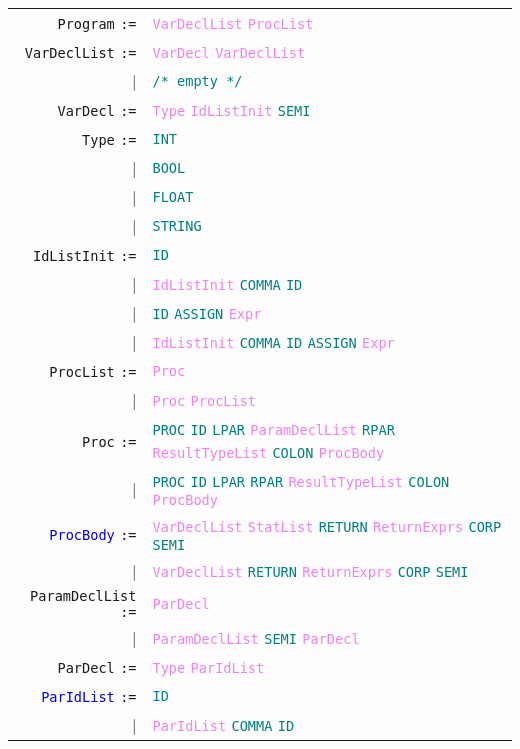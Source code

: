 \documentclass[a4paper,12pt]{article}
\newcommand\nonterm[1]{\texttt{\textcolor{violet}{#1}}}
\newcommand\term[1]{\texttt{\textcolor{teal}{#1}}}
\newcommand\production[1]{\texttt{#1} \texttt{:=}}
\newcommand\emptyprod{\texttt{\textcolor{teal}{/* empty */}}}
\begin{document}
	\begin{tabular}{rl}
    \production{Program}     & \nonterm{VarDeclList} \nonterm{ProcList} \\
	\production{VarDeclList} & \nonterm{VarDecl} \nonterm{VarDeclList} \\
	                                     | & \emptyprod \\
	\production{VarDecl}      & \nonterm{Type} \nonterm{IdListInit} \term{SEMI} \\
	\production{Type}           & \term{INT} \\ 
					   | &\term{BOOL} \\ 
					   | &\term{FLOAT} \\
					   | &\term{STRING} \\
	\production{IdListInit}     &\term{ID} \\
					   |&\nonterm{IdListInit} \term{COMMA} \term{ID} \\
					   |&\term{ID} \term{ASSIGN} \nonterm{Expr} \\
					   |&\nonterm{IdListInit} \term{COMMA} \term{ID} \term{ASSIGN} \nonterm{Expr} \\
	\production{ProcList}    &\nonterm{Proc} \\
					  |&\nonterm{Proc} \nonterm{ProcList} \\
	\production{Proc}         & \term{PROC} \term{ID} \term{LPAR} \nonterm{ParamDeclList} \term{RPAR} \nonterm{ResultTypeList} \term{COLON} %
						\nonterm{ProcBody}\\
					  |& \term{PROC} \term{ID} \term{LPAR} \term{RPAR} \nonterm{ResultTypeList} \term{COLON} \nonterm{ProcBody}\\
	\production{\textcolor{blue}{ProcBody}} & \nonterm{VarDeclList} \nonterm{StatList} \term{RETURN} \nonterm{ReturnExprs} \term{CORP} \term{SEMI} \\
	 				  |& \nonterm{VarDeclList} \term{RETURN} \nonterm{ReturnExprs} \term{CORP} \term{SEMI} \\
	\production{ParamDeclList} & \nonterm{ParDecl} \\
						  |& \nonterm{ParamDeclList} \term{SEMI} \nonterm{ParDecl} \\
	\production{ParDecl}            & \nonterm{Type} \nonterm{ParIdList} \\
	\production{\textcolor{blue}{ParIdList}}           & \term{ID} \\
						  |& \nonterm{ParIdList} \term{COMMA} \term{ID} \\
	\end{tabular}
\end{document}
